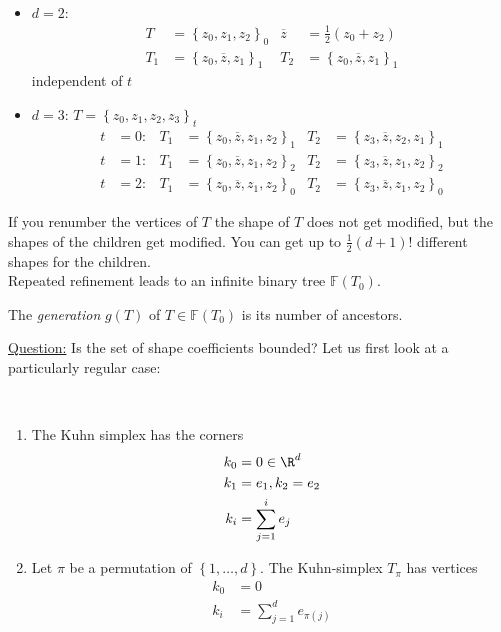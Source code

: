 \begin{example}\
	\begin{itemize}
		\item $d=2$:
			\begin{align*}
				T &= \left\{ z_{0},z_{1},z_{2} \right\}_{0} & \overline{z}&= \frac{1}{2}\left(z_{0} + z_{2} \right)\\
				T_{1} &= \left\{ z_{0},\overline{z},z_{1} \right\}_{1}  & T_{2} &= \left\{ z_{0},\overline{z},z_{1} \right\}_{1}
			\end{align*}
			independent of $t$
			
		\item $d= 3$: \quad $T = \left\{ z_{0},z_{1},z_{2},z_{3} \right\}_{t}$
			\begin{align*}
				t&=0: & T_{1}&= \left\{ z_{0},\overline{z}, z_{1},z_{2} \right\}_{1} & T_{2}&= \left\{ z_{3},\overline{z}, z_{2},z_{1} \right\}_{1}\\
				t&=1: & T_{1}&= \left\{ z_{0},\overline{z}, z_{1},z_{2} \right\}_{2} & T_{2}&= \left\{ z_{3},\overline{z}, z_{1},z_{2} \right\}_{2}\\
				t&=2: & T_{1}&= \left\{ z_{0},\overline{z}, z_{1},z_{2} \right\}_{0} & T_{2}&= \left\{ z_{3},\overline{z}, z_{1},z_{2} \right\}_{0}
			\end{align*}
	\end{itemize}
\end{example}
If you renumber the vertices of $T$ the shape of $T$ does not get modified, but the shapes of the children get modified. You can get up to $\frac{1}{2}\left(d+1 \right)!$ different shapes for the children.\\
Repeated refinement leads to an infinite binary tree $\mathbb{F}(T_{0})$.
\begin{definition}
	The \textit{generation} $g(T)$ of $T \in \mathbb{F}(T_{0})$ is its number of ancestors.
\end{definition}
\underline{Question:} Is the set of shape coefficients bounded?\nl
Let us first look at a particularly regular case:
\begin{definition}\
	\begin{enumerate}[label = \Roman*)]
		\item The Kuhn simplex has the corners
			\begin{align*}
				k_{0}&=0 \in \R^d\\
				k_{1}&=e_{1}, k_{2}=e_{2}\\
				k_{i}&= \sum_{j=1}^{i} e_{j}
			\end{align*}
			
		\item Let $\pi$ be a permutation of $\left\{1,\dots ,d \right\}$. The Kuhn-simplex $T_{\pi}$ has vertices 
			\begin{align*}
				k_{0}&=0 \\
				k_{i}&= \sum_{j=1}^{d} e_{\pi(j)}
			\end{align*}		
	\end{enumerate}
\end{definition}
